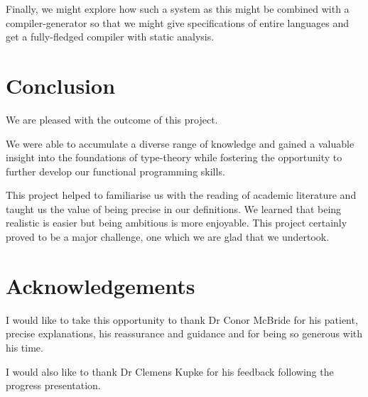 Finally, we might explore how such a system as this might be combined
with a compiler-generator so that we might give specifications of
entire languages and get a fully-fledged compiler with static
analysis.

\section{Conclusion}

We are pleased with the outcome of this project.

We were able to accumulate a diverse range of knowledge and gained a
valuable insight into the foundations of type-theory while fostering
the opportunity to further develop our functional programming skills.

This project helped to familiarise us with the reading of academic
literature and taught us the value of being precise in our
definitions. We learned that being realistic is easier but being
ambitious is more enjoyable. This project certainly proved to be a
major challenge, one which we are glad that we undertook.

\section{Acknowledgements}
I would like to take this opportunity to thank Dr Conor McBride for
his patient, precise explanations, his reassurance and guidance and
for being so generous with his time.

I would also like to thank Dr Clemens Kupke for his feedback following
the progress presentation.
